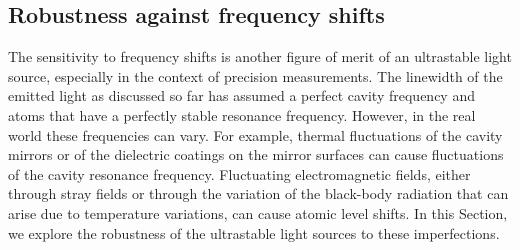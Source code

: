 \documentclass[aps,
twocolumn,
showpacs,
superscriptaddress,groupedaddress]{revtex4}
\begin{document}
\subsection{Robustness against frequency shifts}

The sensitivity to frequency shifts is another figure of merit of an
ultrastable light source, especially in the context of precision
measurements.  The linewidth of the emitted light as discussed so far
has assumed a perfect cavity frequency and atoms that have a perfectly
stable resonance frequency. However, in the real world these
frequencies can vary. For example, thermal fluctuations of the cavity
mirrors or of the dielectric coatings on the mirror surfaces can cause
fluctuations of the cavity resonance frequency. Fluctuating
electromagnetic fields, either through stray fields or through the
variation of the black-body radiation that can arise due to
temperature variations, can cause atomic level shifts. In this
Section, we explore the robustness of the ultrastable light sources to
these imperfections.
\end{document}
